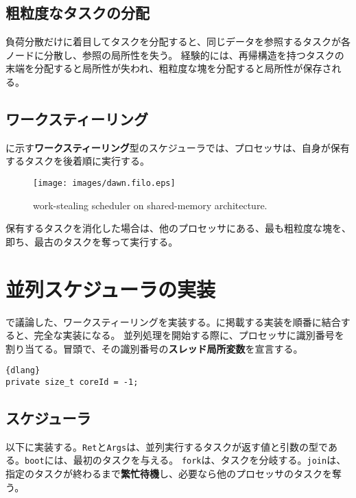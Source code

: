 \documentclass[10pt,a4paper]{book}
\begin{document}
\section{粗粒度なタスクの分配}

負荷分散だけに着目してタスクを分配すると、同じデータを参照するタスクが各ノードに分散し、参照の局所性を失う。
経験的には、再帰構造を持つタスクの末端を分配すると局所性が失われ、粗粒度な塊を分配すると局所性が保存される。

\section{ワークスティーリング\label{sect:filo}}

に示す\textbf{ワークスティーリング}型のスケジューラでは、プロセッサは、自身が保有するタスクを後着順に実行する。

\begin{figure}[h]
\centering
\texttt{[image: images/dawn.filo.eps]}
\caption{work-stealing scheduler on shared-memory architecture.\label{fig:filo}}
\end{figure}

保有するタスクを消化した場合は、他のプロセッサにある、最も粗粒度な塊を、即ち、最古のタスクを奪って実行する。

\chapter{並列スケジューラの実装\label{chap:dawn}}

で議論した、ワークスティーリングを実装する。に掲載する実装を順番に結合すると、完全な実装になる。
並列処理を開始する際に、プロセッサに識別番号を割り当てる。冒頭で、その識別番号の\textbf{スレッド局所変数}を宣言する。

\begin{Verbatim}{dlang}
private size_t coreId = -1;
\end{Verbatim}

\section{スケジューラ}

以下に実装する。\texttt{Ret}と\texttt{Args}は、並列実行するタスクが返す値と引数の型である。\texttt{boot}には、最初のタスクを与える。
\texttt{fork}は、タスクを分岐する。\texttt{join}は、指定のタスクが終わるまで\textbf{繁忙待機}し、必要なら他のプロセッサのタスクを奪う。
\end{document}
